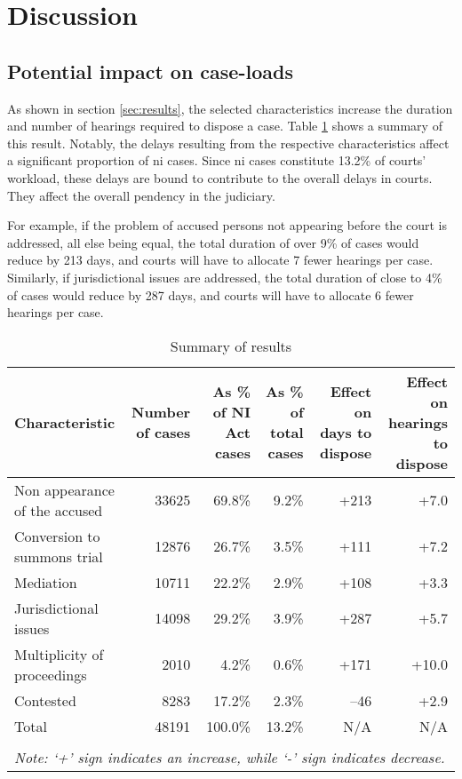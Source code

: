 \section{Discussion}

\subsection{Potential impact on case-loads} \label{sec:impact-case-loads}

As shown in section \ref{sec:results}, the selected characteristics increase the duration and number of hearings required to dispose a case. Table \ref{tab:summary_results} shows a summary of this result. Notably, the delays resulting from the respective characteristics affect a significant proportion of \gls{ni} cases. Since \gls{ni} cases constitute 13.2\% of courts' workload, these delays are bound to contribute to the overall delays in courts. They affect the overall pendency in the judiciary. 

For example, if the problem of accused persons not appearing before the court is addressed, all else being equal, the total duration of over 9\% of cases would reduce by 213 days, and courts will have to allocate 7 fewer hearings per case. Similarly, if jurisdictional issues are addressed, the total duration of close to 4\% of cases would reduce by 287 days, and courts will have to allocate 6 fewer hearings per case. 

{\footnotesize \begin{longtable}{@{}p{2.5cm}rrrrr}
 \caption{Summary of results}\label{tab:summary_results}\\
 \toprule
 \textbf{Characteristic} & \multicolumn{1}{p{2cm}}{\textbf{Number of cases}} &
 \multicolumn{1}{p{2cm}}{\textbf{As \% of NI Act cases}}
 & \multicolumn{1}{p{2cm}}{\textbf{As \% of total cases}}
 & \multicolumn{1}{p{2cm}}{\textbf{Effect on days to dispose}} &
 \multicolumn{1}{p{2cm}}{\textbf{Effect on hearings to dispose}}
 \\
 \midrule
 Non appearance of the accused & 33625 & 69.8\% & 9.2\% & +213 & +7.0 \\ \midrule
 Conversion to summons trial & 12876 & 26.7\% & 3.5\% & +111 & +7.2 \\ \midrule
 Mediation & 10711 & 22.2\% & 2.9\% & +108 & +3.3 \\ \midrule
 Jurisdictional issues & 14098 & 29.2\% & 3.9\% & +287 & +5.7 \\ \midrule
 Multiplicity of proceedings & 2010 & 4.2\% & 0.6\% & +171 & +10.0 \\ \midrule
 Contested & 8283 & 17.2\% & 2.3\% & --46 & +2.9 \\ \midrule
 Total & 48191 & 100.0\% & 13.2\% & N/A & N/A \\
 \bottomrule
 \\
 \multicolumn{6}{l}{{\footnotesize \emph{Note: `+' sign
  indicates an increase, while `-' sign indicates decrease.}}}\\
\end{longtable}
}

